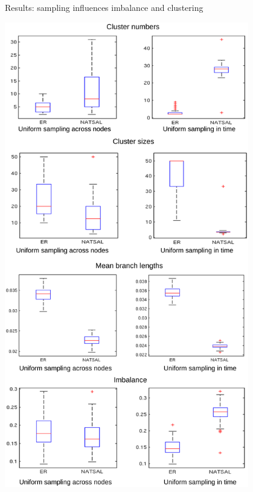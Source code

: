 \documentclass{beamer}
\begin{document}
\begin{frame}{Results: sampling influences imbalance and clustering}
    \begin{center}
        \vspace{-0.5cm}
        \includegraphics[width=0.8\textwidth, trim=0 7.1cm 0 0, clip=true]{f11}


\end{center}
\end{frame}
\end{document}

